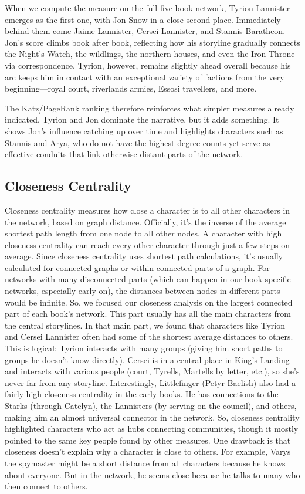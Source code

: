 \documentclass[12pt, a4paper]{article}
\begin{document}
When we compute the measure on the full five-book network, Tyrion Lannister emerges as the first one,
 with Jon Snow in a close second place. Immediately behind them come Jaime Lannister, Cersei Lannister, and Stannis Baratheon. Jon's score climbs book after book, reflecting how his storyline gradually connects the Night's Watch, the wildlings, the northern houses, and even the Iron Throne via correspondence. Tyrion, however, remains slightly ahead overall because his arc keeps him in contact with an exceptional variety of factions from the very beginning—royal court, riverlands armies, Essosi travellers, and more.

The Katz/PageRank ranking therefore reinforces what simpler measures already indicated, 
Tyrion and Jon dominate the narrative, but it adds something. 
It shows Jon's influence catching up over time and highlights 
characters such as Stannis and Arya, who do not have the 
highest degree counts yet serve as effective conduits that
 link otherwise distant parts of the network.


\subsection*{Closeness Centrality}
Closeness centrality measures how close a character is to all other characters in the network, based on graph distance. Officially, it's the inverse of the average shortest path length from one node to all other nodes. A character with high closeness centrality can reach every other character through just a few steps on average. Since closeness centrality uses shortest path calculations, it's usually calculated for connected graphs or within connected parts of a graph. For networks with many disconnected parts (which can happen in our book-specific networks, especially early on), the distances between nodes in different parts would be infinite. So, we focused our closeness analysis on the largest connected part of each book's network. This part usually has all the main characters from the central storylines. In that main part, we found that characters like Tyrion and Cersei Lannister often had some of the shortest average distances to others. This is logical: Tyrion interacts with many groups (giving him short paths to groups he doesn't know directly). Cersei is in a central place in King's Landing and interacts with various people (court, Tyrells, Martells by letter, etc.), so she's never far from any storyline. Interestingly, Littlefinger (Petyr Baelish) also had a fairly high closeness centrality in the early books. He has connections to the Starks (through Catelyn), the Lannisters (by serving on the council), and others, making him an almost universal connector in the network. So, closeness centrality highlighted characters who act as hubs connecting communities, though it mostly pointed to the same key people found by other measures. One drawback is that closeness doesn't explain why a character is close to others. For example, Varys the spymaster might be a short distance from all characters because he knows about everyone. But in the network, he seems close because he talks to many who then connect to others.
\end{document}
